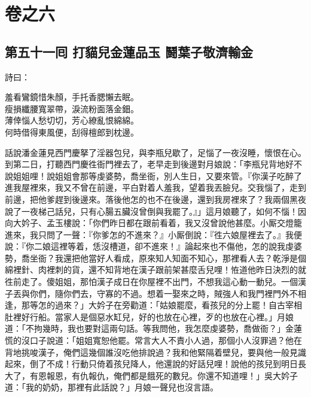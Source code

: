 \part*{{\titlename}卷之六}



\chapter*{第五十一囘 打貓兒金蓮品玉 鬪葉子敬濟輸金}


詩曰：

\begin{myquote} 
羞看鸞鏡惜朱顏，手托香腮懶去眠。\\瘦損纖腰寬翠帶，淚流粉面落金鈿。\\薄倖惱人愁切切，芳心繚亂恨綿綿。\\何時借得東風便，刮得檀郎到枕邊。
\end{myquote} 

話說潘金蓮見西門慶拏了淫器包兒，與李瓶兒歇了，足惱了一夜沒睡，{}懷恨在心。到第二日，打聽西門慶徃衙門裡去了，老早走到後邊對月娘說：「李瓶兒背地好不說姐姐哩！說姐姐會那等虔婆勢，喬坐衙，別人生日，又要來管。『你漢子吃醉了進我屋裡來，我又不曾在前邊，平白對着人羞我，望着我丟臉兒。交我惱了，走到前邊，把他爹趕到後邊來。落後他怎的也不在後邊，還到我房裡來了？我兩個黑夜說了一夜梯己話兒，只有心腸五臟沒曾倒與我罷了。』」{}這月娘聽了，如何不惱！因向大妗子、孟玉樓說：「你們昨日都在跟前看着，我又沒曾說他甚麼。小厮交燈籠進來，我只問了一聲：『你爹怎的不進來？』小厮倒說：『徃六娘屋裡去了。』我便說：『你二娘這裡等着，恁沒槽道，卻不進來！』論起來也不傷他，怎的說我虔婆勢，喬坐衙？我還把他當好人看成，原來知人知面不知心，那裡看人去？乾淨是個綿裡針、肉裡刺的貨，還不知背地在漢子跟前架甚麼舌兒哩！{}恠道他昨日決烈的就徃前走了。傻姐姐，那怕漢子成日在你屋裡不出門，不想我這心動一動兒。{}一個漢子丟與你們，隨你們去，守寡的不過。想着一娶來之時，賊強人和我門裡門外不相逢，那等怎的過來？」{}大妗子在旁勸道：「姑娘罷麼，看孩兒的分上罷！自古宰相肚裡好行船。當家人是個惡水缸兒，好的也放在心裡，歹的也放在心裡。」月娘道：「不拘幾時，我也要對這兩句話。等我問他，我怎麼虔婆勢，喬做衙？」金蓮慌的沒口子說道：「姐姐寬恕他罷。常言大人不責小人過，那個小人沒罪過？{}他在背地挑唆漢子，俺們這幾個誰沒吃他排說過？我和他緊隔着壁兒，要與他一般見識起來，倒了不成！行動只倚着孩兒降人，他還說的好話兒哩！說他的孩兒到明日長大了，有恩報恩，有仇報仇，俺們都是餓死的數兒。你還不知道哩！」吳大妗子道：「我的奶奶，那裡有此話說？」{}月娘一聲兒也沒言語。

